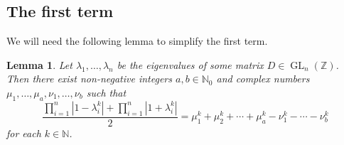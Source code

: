 \documentclass[a4paper]{article}
\theoremstyle{plain}
\newtheorem{lemma}[theorem]{Lemma}
\theoremstyle{definition}
\theoremstyle{remark}
\DeclareMathOperator{\GL}{GL}
\newcommand{\NN}{{\mathbb{N}}}
\newcommand{\ZZ}{{\mathbb{Z}}}
\begin{document}
\subsection{The first term}
We will need the following lemma to simplify the first term.
\begin{lemma}
	\label{lem:firsttermkthpowers}
	Let \(\lambda_1, \dots, \lambda_n\) be the eigenvalues of some matrix \(D \in \GL_n(\ZZ)\). Then there exist non-negative  integers \(a, b \in \NN_0\) and complex numbers \(\mu_1, \dots, \mu_{a},\nu_{1}, \dots, \nu_b\) such that 
	\begin{equation*}
	\frac{\prod_{i=1}^{n}|1-\lambda_i^k|+\prod_{i=1}^{n}|1+\lambda_i^k|}{2} = \mu_1^k + \mu_2^k + \cdots + \mu_{a}^k - \nu_{1}^k - \cdots - \nu_b^k
	\end{equation*}
	for each \(k \in \NN\).
\end{lemma}
\end{document}
